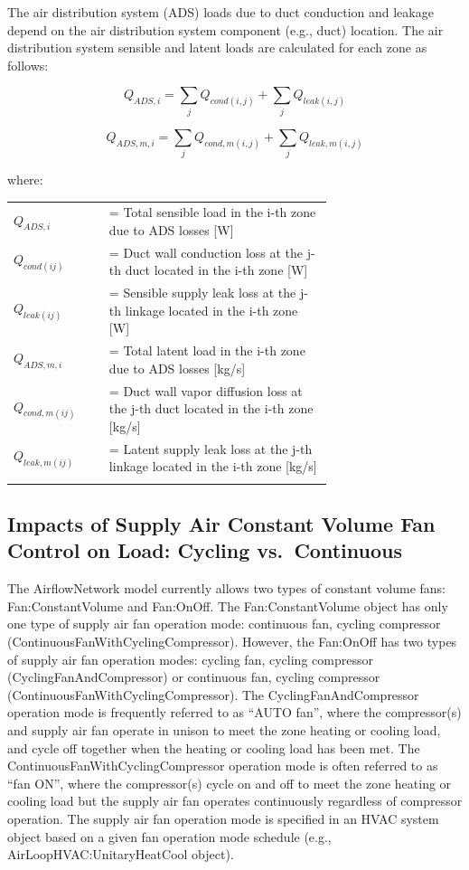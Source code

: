 The air distribution system (ADS) loads due to duct conduction and leakage depend on the air distribution system component (e.g., duct) location. The air distribution system sensible and latent loads are calculated for each zone as follows:

\begin{equation}
Q_{ADS,i} = \sum_{j} Q_{cond(i,j)} + \sum_{j} Q_{leak(i,j)}
\end{equation}

\begin{equation}
Q_{ADS,m,i} = \sum_{j} Q_{cond,m(i,j)} + \sum_{j} Q_{leak,m(i,j)}
\end{equation}

where:

\begin{tabular}{lp{0.7\linewidth}}
\\
$Q_{ADS,i}$ &= Total sensible load in the i-th zone due to ADS losses [W]\\
$Q_{cond(ij)}$ &= Duct wall conduction loss at the j-th duct located in the i-th zone [W]\\
$Q_{leak(ij)}$ &= Sensible supply leak loss at the j-th linkage located in the i-th zone [W]\\
$Q_{ADS,m,i}$ &= Total latent load in the i-th zone due to ADS losses [kg/s]\\
$Q_{cond,m(ij)}$ &= Duct wall vapor diffusion loss at the j-th duct located in the i-th zone [kg/s]\\
$Q_{leak,m(ij)}$ &= Latent supply leak loss at the j-th linkage located in the i-th zone [kg/s]\\
\\
\end{tabular}

\subsection{Impacts of Supply Air Constant Volume Fan Control on Load: Cycling vs.~Continuous}\label{impacts-of-supply-air-constant-volume-fan-control-on-load-cycling-vs.continuous}

The AirflowNetwork model currently allows two types of constant volume fans: Fan:ConstantVolume and Fan:OnOff. The Fan:ConstantVolume object has only one type of supply air fan operation mode: continuous fan, cycling compressor (ContinuousFanWithCyclingCompressor). However, the Fan:OnOff has two types of supply air fan operation modes: cycling fan, cycling compressor (CyclingFanAndCompressor) or continuous fan, cycling compressor (ContinuousFanWithCyclingCompressor). The CyclingFanAndCompressor operation mode is frequently referred to as ``AUTO fan'', where the compressor(s) and supply air fan operate in unison to meet the zone heating or cooling load, and cycle off together when the heating or cooling load has been met. The ContinuousFanWithCyclingCompressor operation mode is often referred to as ``fan ON'', where the compressor(s) cycle on and off to meet the zone heating or cooling load but the supply air fan operates continuously regardless of compressor operation. The supply air fan operation mode is specified in an HVAC system object based on a given fan operation mode schedule (e.g., AirLoopHVAC:UnitaryHeatCool object).

